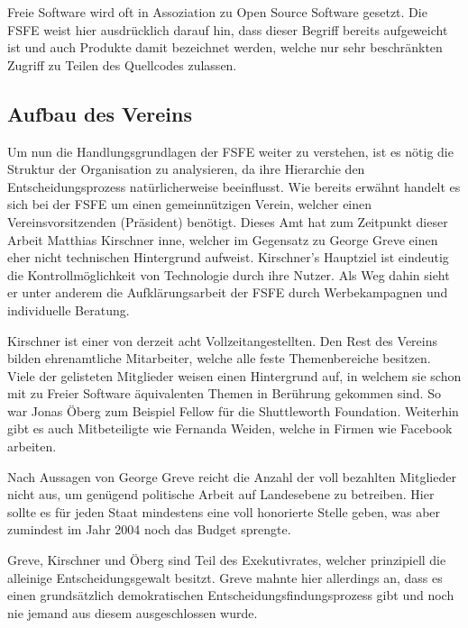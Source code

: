 Freie Software wird oft in Assoziation zu Open Source Software gesetzt. Die
FSFE weist hier ausdrücklich darauf hin, dass dieser Begriff bereits aufgeweicht
ist und auch Produkte damit bezeichnet werden, welche \ua nur sehr beschränkten
Zugriff zu Teilen des Quellcodes zulassen.

\subsection{Aufbau des Vereins}
Um nun die Handlungsgrundlagen der FSFE weiter zu verstehen, ist es nötig
die Struktur der Organisation zu analysieren, da ihre Hierarchie den 
Entscheidungsprozess natürlicherweise beeinflusst. Wie bereits erwähnt handelt 
es sich bei
der FSFE um einen gemeinnützigen Verein, welcher einen Vereinsvorsitzenden 
(Präsident) benötigt. Dieses Amt hat zum Zeitpunkt dieser Arbeit Matthias 
Kirschner inne, welcher im 
Gegensatz zu George Greve einen eher nicht technischen Hintergrund aufweist.
Kirschner's Hauptziel ist eindeutig die Kontrollmöglichkeit von Technologie 
durch ihre Nutzer. Als Weg dahin sieht er unter anderem die Aufklärungsarbeit 
der FSFE durch Werbekampagnen und individuelle
Beratung. \cite{TAZKirschnerInterView} \cite{YTKirschnerInterView}

Kirschner ist einer von derzeit acht Vollzeitangestellten.\cite{FsfeTeam} Den
Rest des Vereins bilden ehrenamtliche Mitarbeiter, welche alle feste 
Themenbereiche besitzen. Viele
der gelisteten Mitglieder weisen einen Hintergrund auf, in welchem sie schon 
mit zu Freier Software äquivalenten Themen 
in Berührung gekommen sind. So war Jonas Öberg zum Beispiel Fellow für die
Shuttleworth Foundation. Weiterhin gibt es auch Mitbeteiligte wie Fernanda 
Weiden, welche in Firmen wie Facebook arbeiten. \cite{FsfeTeam}

Nach Aussagen von George Greve reicht die Anzahl der voll bezahlten 
Mitglieder nicht aus, um genügend politische Arbeit auf Landesebene zu 
betreiben. Hier sollte es für jeden Staat mindestens eine voll honorierte Stelle
geben, was aber zumindest im Jahr 2004 noch das Budget 
sprengte. \cite{PLGreveInterView}

Greve, Kirschner und Öberg sind Teil des Exekutivrates, welcher prinzipiell
die alleinige Entscheidungsgewalt besitzt. Greve mahnte hier allerdings an, dass
es einen grundsätzlich demokratischen Entscheidungsfindungsprozess gibt und 
noch nie jemand aus diesem ausgeschlossen wurde. \cite{PLGreveInterView}

